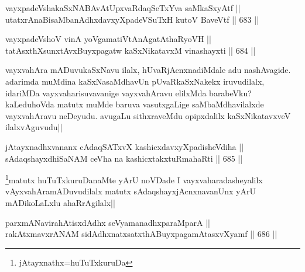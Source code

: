 
\begin{shl}
vayxpadeVshakaSxNABAvAtUpxvaRdaqSeTxYva saMkaSxyAtf || \\
utatxrAnaBisaMbanAdhxdavxyXpadeVSuTxH kutoV BaveVtf ||  683 ||  
\end{shl}

\begin{shl}
vayxpadeVshoV vinA yoVgamatiVtAnAgatAthaRyoVH || \\
tatAsxthXsunxtAvxBuyxpagatw kaSxNikatavxM vinashayxti ||  684 ||  
\end{shl}

\begin{artha}
vayxvahAra mADuvukaSxNavu ilalx, hUvaRjAcnxnadiMdale adu nashAvagide. adarimda muMdina kaSxNasaMdhavUn pUvaRkaSxNakekx iruvudilalx, idariMDa vayxvaharisuvavanige vayxvahAravu elilxMda barabeVku? kaLeduhoVda matutx muMde baruva vasutxgaLige saMbaMdhavilalxde vayxvahAravu neDeyudu. avugaLu sithxraveMdu opipxdalilx kaSxNikatavxveV ilalxvAguvudu||
\end{artha}

\begin{shl}
jAtayxnadhxvananx cAdaqSATxvX kashicxdavxyXpadisheVdiha || \\
sAdaqshayxdhiSaNAM ceVha na kashicxtakxtuRmahaRti ||  685 ||  
\end{shl}

\begin{artha}
\footnote{jAtayxnathx=huTuTxkuruDa}matutx huTuTxkuruDanaMte yArU noVDade I vayxvaharadasheyalilx vAyxvahAramADuvudilalx matutx sAdaqshayxjAcnxnavanUnx yArU mADikoLaLxlu ahaRrAgilalx||
\end{artha}

\begin{shl}
parxmANavirahAtisxdAdhx seVyamanadhxparaMparA || \\
rakAtxmavxrANAM sidAdhxnatxsatxthA\s BuyxpagamAtasxvXyamf ||  686 ||  
\end{shl}

